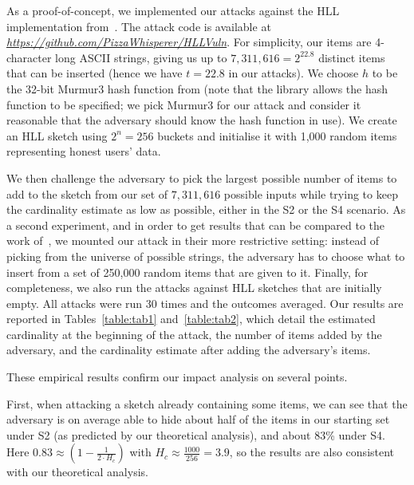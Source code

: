 \documentclass{IEEEtran}
\newcommand{\mathilde}[1]{\todo[inline]{\textbf{Mathilde:} #1}\xspace}
\newcommand{\kenny}[1]{\todo[inline]{\textbf{Kenny:} #1}\xspace}
\begin{document}
As a proof-of-concept, we implemented our attacks against the HLL implementation from~\cite{clahll}. The attack code is available at \href{https://github.com/PizzaWhisperer/HLLVuln}{\textit{\url{https://github.com/PizzaWhisperer/HLLVuln}}}. For simplicity, our items are 4-character long ASCII strings, giving us up to $7,311,616= 2^{22.8}$ distinct items that can be inserted (hence we have $t=22.8$ in our attacks). We choose $h$ to be the 32-bit Murmur3 hash function from \cite{murmur3code} (note that the library allows the hash function to be specified; we pick Murmur3 for our attack and consider it reasonable that the adversary should know the hash function in use).
We create an HLL sketch using $2^n = 256$ buckets and initialise it with 1,000 random items representing honest users' data.

We then challenge the adversary to pick the largest possible number of items to add to the sketch from our set of  $7,311,616$ possible inputs while trying to keep the cardinality estimate as low as possible, either in the S2 or the S4 scenario. As a second experiment, and in order to get results that can be compared to the work of~\cite{hllvuln}, we mounted our attack in their more restrictive setting: instead of picking from the universe of possible strings, the adversary has to choose what to insert from a set of 250,000 random items that are given to it. Finally, for completeness, we also run the attacks against HLL sketches that are initially empty. All attacks were run 30 times and the outcomes averaged. Our results are reported in Tables~\ref{table:tab1} and~\ref{table:tab2}, which detail the estimated cardinality at the beginning of the attack, the number of items added by the adversary, and the cardinality estimate after adding the adversary's items.

These empirical results confirm our impact analysis on several points.

First, when attacking a sketch already containing some items, we can see that the adversary is on average able to hide about half of the items in our starting set under S2 (as predicted by our theoretical analysis), and about 83\% under S4. %
Here $0.83 \approx (1-\frac{1}{2\cdot H_c})$ with $H_c\approx\frac{1000}{256}=3.9$, so the results are also consistent with our theoretical analysis.
\end{document}
